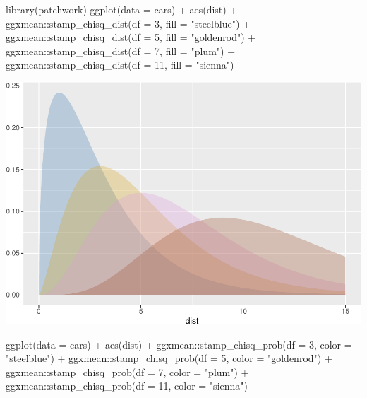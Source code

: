 \documentclass[12pt]{article}
\newenvironment{Shaded}{\begin{snugshade}}{\end{snugshade}}
\newcommand{\AttributeTok}[1]{\textcolor[rgb]{0.77,0.63,0.00}{#1}}
\newcommand{\DecValTok}[1]{\textcolor[rgb]{0.00,0.00,0.81}{#1}}
\newcommand{\FunctionTok}[1]{\textcolor[rgb]{0.00,0.00,0.00}{#1}}
\newcommand{\NormalTok}[1]{#1}
\newcommand{\SpecialCharTok}[1]{\textcolor[rgb]{0.00,0.00,0.00}{#1}}
\newcommand{\StringTok}[1]{\textcolor[rgb]{0.31,0.60,0.02}{#1}}
\begin{document}
\begin{Shaded}
\begin{Highlighting}[]
\FunctionTok{library}\NormalTok{(patchwork)}
\FunctionTok{ggplot}\NormalTok{(}\AttributeTok{data =}\NormalTok{ cars) }\SpecialCharTok{+}
  \FunctionTok{aes}\NormalTok{(dist) }\SpecialCharTok{+}
\NormalTok{  ggxmean}\SpecialCharTok{::}\FunctionTok{stamp\_chisq\_dist}\NormalTok{(}\AttributeTok{df =} \DecValTok{3}\NormalTok{,}
                   \AttributeTok{fill =} \StringTok{"steelblue"}\NormalTok{) }\SpecialCharTok{+}
\NormalTok{  ggxmean}\SpecialCharTok{::}\FunctionTok{stamp\_chisq\_dist}\NormalTok{(}\AttributeTok{df =} \DecValTok{5}\NormalTok{,}
                   \AttributeTok{fill =} \StringTok{"goldenrod"}\NormalTok{) }\SpecialCharTok{+}
\NormalTok{  ggxmean}\SpecialCharTok{::}\FunctionTok{stamp\_chisq\_dist}\NormalTok{(}\AttributeTok{df =} \DecValTok{7}\NormalTok{,}
                   \AttributeTok{fill =} \StringTok{"plum"}\NormalTok{) }\SpecialCharTok{+}
\NormalTok{  ggxmean}\SpecialCharTok{::}\FunctionTok{stamp\_chisq\_dist}\NormalTok{(}\AttributeTok{df =} \DecValTok{11}\NormalTok{,}
                   \AttributeTok{fill =} \StringTok{"sienna"}\NormalTok{)}
\end{Highlighting}
\end{Shaded}

\begin{center}\includegraphics[width=0.5\linewidth]{skeleton_files/figure-latex/unnamed-chunk-10-1} \end{center}

\begin{Shaded}
\begin{Highlighting}[]
\FunctionTok{ggplot}\NormalTok{(}\AttributeTok{data =}\NormalTok{ cars) }\SpecialCharTok{+}
  \FunctionTok{aes}\NormalTok{(dist) }\SpecialCharTok{+}
\NormalTok{  ggxmean}\SpecialCharTok{::}\FunctionTok{stamp\_chisq\_prob}\NormalTok{(}\AttributeTok{df =} \DecValTok{3}\NormalTok{,}
                   \AttributeTok{color =} \StringTok{"steelblue"}\NormalTok{) }\SpecialCharTok{+}
\NormalTok{  ggxmean}\SpecialCharTok{::}\FunctionTok{stamp\_chisq\_prob}\NormalTok{(}\AttributeTok{df =} \DecValTok{5}\NormalTok{,}
                   \AttributeTok{color =} \StringTok{"goldenrod"}\NormalTok{) }\SpecialCharTok{+}
\NormalTok{  ggxmean}\SpecialCharTok{::}\FunctionTok{stamp\_chisq\_prob}\NormalTok{(}\AttributeTok{df =} \DecValTok{7}\NormalTok{,}
                   \AttributeTok{color =} \StringTok{"plum"}\NormalTok{) }\SpecialCharTok{+}
\NormalTok{  ggxmean}\SpecialCharTok{::}\FunctionTok{stamp\_chisq\_prob}\NormalTok{(}\AttributeTok{df =} \DecValTok{11}\NormalTok{,}
                   \AttributeTok{color =} \StringTok{"sienna"}\NormalTok{) }
\end{Highlighting}
\end{Shaded}
\end{document}
